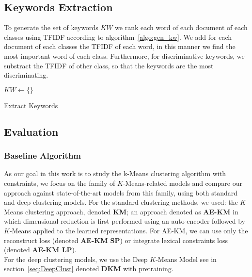 \subsection{Keywords Extraction}
To generate the set of keywords $KW$ we rank each word of each 
document of each classes using TFIDF according to algorithm~\ref{algo:gen_kw}.
We add for each document of each classes the TFIDF of each word, in this manner
we find the most important word of each class. Furthermore, for discriminative keywords,
we substract  the TFIDF of other class, so that the keywords are the most discriminating.
\begin{algorithm}
  $KW \gets \{\}$\\
  \caption{\label{algo:gen_kw}Extract Keywords}
\end{algorithm}
\subsection{Evaluation}
\subsubsection{Baseline Algorithm}
As our goal in this work is to study the k-Means clustering algorithm with 
constraints, we focus on the family of $K$-Means-related models and compare our 
approach against state-of-the-art models from this family, using both standard 
and deep clustering models. For the standard clustering methods, we used: the 
$K$-Means clustering approach, denoted \textbf{KM}; an approach denoted as \textbf{AE-KM} in which 
dimensional reduction is first performed using an auto-encoder followed by 
$K$-Means applied to the learned representations. For AE-KM, we can use only 
the reconstruct loss (denoted \textbf{AE-KM SP}) or integrate lexical constraints loss 
(denoted \textbf{AE-KM LP}).\\For the deep clustering models, we use the Deep $K$-Means 
Model see in section~\ref{seq:DeepClust} denoted \textbf{DKM} with pretraining.
